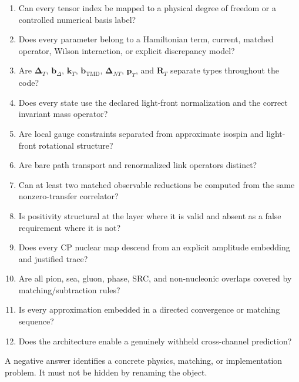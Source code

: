 \documentclass[11pt]{article}
\newcommand{\kT}{\bm{k}_{T}}
\newcommand{\pT}{\bm{p}_{T}}
\newcommand{\DT}{\bm{\Delta}_{T}}
\newcommand{\DNT}{\bm{\Delta}_{N T}}
\newcommand{\bD}{\bm{b}_{\Delta}}
\newcommand{\bM}{\bm{b}_{\mathrm{TMD}}}
\newcommand{\RT}{\bm{R}_{T}}
\begin{document}
\begin{enumerate}
\item Can every tensor index be mapped to a physical degree of freedom or a
controlled numerical basis label?
\item Does every parameter belong to a Hamiltonian term, current, matched
operator, Wilson interaction, or explicit discrepancy model?
\item Are \(\DT\), \(\bD\), \(\kT\), \(\bM\), \(\DNT\), \(\pT\), and \(\RT\) separate types throughout the code?
\item Does every state use the declared light-front normalization and the
correct invariant mass operator?
\item Are local gauge constraints separated from approximate isospin and
light-front rotational structure?
\item Are bare path transport and renormalized link operators distinct?
\item Can at least two matched observable reductions be computed from the
same nonzero-transfer correlator?
\item Is positivity structural at the layer where it is valid and absent as a
false requirement where it is not?
\item Does every CP nuclear map descend from an explicit amplitude embedding
and justified trace?
\item Are all pion, sea, gluon, phase, SRC, and non-nucleonic overlaps covered
by matching/subtraction rules?
\item Is every approximation embedded in a directed convergence or matching
sequence?
\item Does the architecture enable a genuinely withheld cross-channel
prediction?
\end{enumerate}
A negative answer identifies a concrete physics, matching, or implementation
problem.  It must not be hidden by renaming the object.
\end{document}
